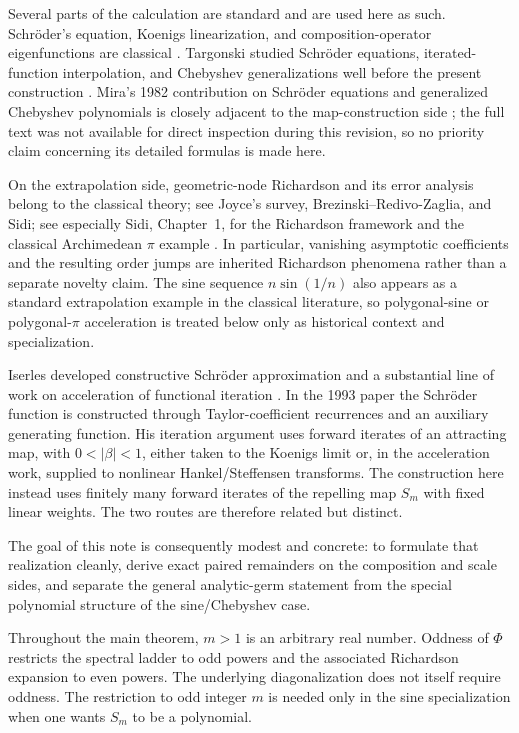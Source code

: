 \documentclass[11pt]{article}
\theoremstyle{remark}
\begin{document}
Several parts of the calculation are standard and are used here as such.
Schr\"oder's equation, Koenigs linearization, and composition-operator
eigenfunctions are classical \cite{Schroeder1871,Koenigs1884}.  Targonski
studied Schr\"oder equations, iterated-function interpolation, and
Chebyshev generalizations well before the present construction
\cite{Targonski1957,Targonski1965,Targonski1967}.  Mira's 1982 contribution
on Schr\"oder equations and generalized Chebyshev polynomials is closely
adjacent to the map-construction side \cite{Mira1982}; the full text was
not available for direct inspection during this revision, so no priority
claim concerning its detailed formulas is made here.

On the extrapolation side, geometric-node Richardson and its error
analysis belong to the classical theory; see Joyce's survey,
Brezinski--Redivo-Zaglia, and Sidi; see especially Sidi, Chapter~1, for the Richardson framework and the classical Archimedean $\pi$ example \cite{Joyce1971,BrezinskiRedivo1991,Sidi2003}.
In particular, vanishing asymptotic coefficients and the resulting order
jumps are inherited Richardson phenomena rather than a separate novelty
claim.  The sine sequence \(n\sin(1/n)\) also appears as a standard
extrapolation example in the classical literature, so polygonal-sine or
polygonal-\(\pi\) acceleration is treated below only as historical context
and specialization.

Iserles developed constructive Schr\"oder approximation and a substantial
line of work on acceleration of functional iteration
\cite{Iserles1991,IserlesSaffLiu1992,Iserles1993,Iserles1994}.  In the 1993
paper the Schr\"oder function is constructed through Taylor-coefficient
recurrences and an auxiliary generating function.  His iteration argument uses
forward iterates of an attracting map, with $0<|\beta|<1$, either taken to the
Koenigs limit or, in the acceleration work, supplied to nonlinear
Hankel/Steffensen transforms.  The construction here instead uses finitely many
forward iterates of the repelling map $S_m$ with fixed linear weights.  The two
routes are therefore related but distinct.

The goal of this note is consequently modest and concrete: to formulate
that realization cleanly, derive exact paired remainders on the
composition and scale sides, and separate the general analytic-germ
statement from the special polynomial structure of the sine/Chebyshev
case.

Throughout the main theorem, \(m>1\) is an arbitrary real number.  Oddness
of \(\Phi\) restricts the spectral ladder to odd powers and the associated
Richardson expansion to even powers.  The underlying diagonalization does
not itself require oddness.  The restriction to odd integer \(m\) is
needed only in the sine specialization when one wants \(S_m\) to be a
polynomial.
\end{document}
